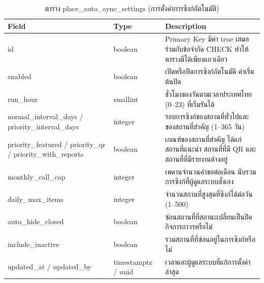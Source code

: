 \begin{table}[H]
\centering
\caption{ตาราง place\_auto\_sync\_settings (การตั้งค่าการซิงก์อัตโนมัติ)}
\label{tab:db_autosync}
\begin{tabular}{|p{3.6cm}|p{2.6cm}|p{6.8cm}|}
\hline
\textbf{Field} & \textbf{Type} & \textbf{Description} \\
\hline
id & boolean & Primary Key มีค่า true เสมอ ร่วมกับข้อจำกัด CHECK ทำให้ตารางมีได้เพียงแถวเดียว \\ \hline
enabled & boolean & เปิดหรือปิดการซิงก์อัตโนมัติ ค่าเริ่มต้นปิด \\ \hline
run\_hour & smallint & ชั่วโมงของวันตามเวลาประเทศไทย (0--23) ที่เริ่มรันได้ \\ \hline
normal\_interval\_days / priority\_interval\_days & integer & รอบการซิงก์ของสถานที่ทั่วไปและของสถานที่สำคัญ (1--365 วัน) \\ \hline
priority\_featured / priority\_qr / priority\_with\_reports & boolean & เกณฑ์ของสถานที่สำคัญ ได้แก่ สถานที่แนะนำ สถานที่ที่มี QR และสถานที่ที่มีรายงานค้างอยู่ \\ \hline
monthly\_call\_cap & integer & เพดานจำนวนคำขอต่อเดือน นับรวมการซิงก์ที่ผู้ดูแลระบบสั่งเอง \\ \hline
daily\_max\_items & integer & จำนวนสถานที่สูงสุดที่ซิงก์ได้ต่อวัน (1--500) \\ \hline
auto\_hide\_closed & boolean & ซ่อนสถานที่ที่สถานะเปลี่ยนเป็นปิดกิจการถาวรหรือไม่ \\ \hline
include\_inactive & boolean & รวมสถานที่ที่ซ่อนอยู่ในการซิงก์หรือไม่ \\ \hline
updated\_at / updated\_by & timestamptz / uuid & เวลาและผู้ดูแลระบบที่แก้การตั้งค่าล่าสุด \\
\hline
\end{tabular}
\end{table}

